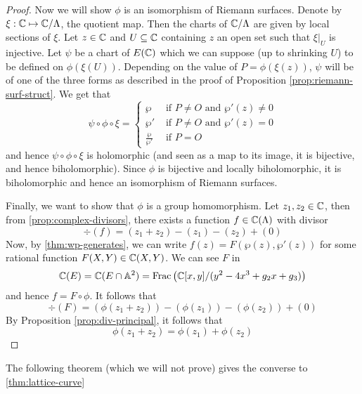 \begin{proof}
	Now we will show $\phi$ is an isomorphism of Riemann surfaces.
	Denote by $\xi: \mathbb{C} \mapsto \mathbb{C}/\Lambda$, the quotient map.
	Then the charts of $\mathbb{C}/\Lambda$ are given by local sections of $\xi$.
	Let $z \in \mathbb{C}$ and $U \subseteq \mathbb{C}$ containing $z$ an open set such that 
	$\xi\vert_U$ is injective. Let $\psi$ be a chart of $E(\mathbb{C})$
	which we can suppose (up to shrinking $U$) to be defined on
	$\phi(\xi(U))$.
	Depending on the value of $P = \phi(\xi(z))$, $\psi$ will be of one of the
	three forms as described in the proof of 
	Proposition \ref{prop:riemann-surf-struct}.
	We get that
	\begin{equation*}
		\psi\circ\phi\circ\xi = 
		\begin{cases}
			\wp &\textrm{ if } P \neq O\textrm{ and }\wp'(z) \neq 0\\
			\wp' &\textrm{ if } P \neq O\textrm{ and }\wp'(z) = 0\\
			\frac{\wp}{\wp'} &\textrm{ if }P = O
		\end{cases}
	\end{equation*}
	and hence $\psi\circ\phi\circ\xi$ is holomorphic (and seen as a map to its
	image, it is bijective, and hence biholomorphic). Since $\phi$ is
	bijective and locally biholomorphic, it is
	biholomorphic and hence an isomorphism of Riemann surfaces.
	
	Finally, we want to show that $\phi$ is a group homomorphism.
	Let $z_1, z_2 \in \mathbb{C}$, then from \ref{prop:complex-divisors}, there exists
	a function $f \in \mathbb{C}(\Lambda)$ with divisor
	\begin{equation*}
		\div(f) = (z_1 + z_2) - (z_1) - (z_2) + (0)
	\end{equation*}
	Now, by \ref{thm:wp-generates}, we can write $f(z) = F(\wp(z), \wp'(z))$ for
	some rational function $F(X, Y) \in \mathbb{C}(X, Y)$. We can see $F$ in
	\begin{equation*}
		\mathbb{C}(E) = \mathbb{C}(E\cap \mathbb{A}^2) = \operatorname{Frac}\left(\mathbb{C}[x, y]/(y^2 - 4x^3 + g_2x + g_3)\right)	
	\end{equation*}
	and hence $f = F \circ \phi$. It follows that
	\begin{equation*}
		\div (F) = (\phi(z_1 + z_2)) - (\phi(z_1)) - (\phi(z_2)) + (0)
	\end{equation*}
	By Proposition \ref{prop:div-principal}, it follows that
	\begin{equation*}
		\phi(z_1 + z_2) = \phi(z_1) + \phi(z_2)
	\end{equation*}
\end{proof}

The following theorem (which we will not prove) gives the converse to \ref{thm:lattice-curve}

